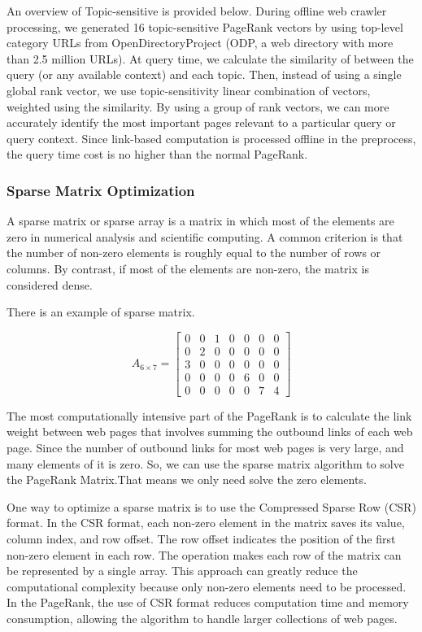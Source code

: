 \documentclass[lettersize,journal,12pt,conference]{IEEEtran}
\begin{document}
An overview of Topic-sensitive is provided below. During offline web crawler processing, we generated 16 topic-sensitive PageRank vectors by using top-level category URLs from OpenDirectoryProject (ODP, a web directory with more than 2.5 million URLs). At query time, we calculate the similarity of between the query (or any available context) and each topic. Then, instead of using a single global rank vector, we use topic-sensitivity linear combination of vectors, weighted using the similarity. By using a group of rank vectors, we can more accurately identify the most important pages relevant to a particular query or query context. Since link-based computation is processed offline in the preprocess, the query time cost is no higher than the normal PageRank.
\subsubsection{Sparse Matrix Optimization}
A sparse matrix or sparse array is a matrix in which most of the elements are zero in numerical analysis and scientific computing. A common criterion is that the number of non-zero elements is roughly equal to the number of rows or columns. By contrast, if most of the elements are non-zero, the matrix is considered dense.

There is an example of sparse matrix.

\begin{equation}
	A_{6\times 7}=
	\begin{bmatrix}
		0&0&1&0&0&0&0\\
		0&2&0&0&0&0&0\\
		3&0&0&0&0&0&0\\
		0&0&0&0&6&0&0\\
		0&0&0&0&0&7&4
	\end{bmatrix}
\end{equation}

The most computationally intensive part of the PageRank is to calculate the link weight between web pages that involves summing the outbound links of each web page. Since the number of outbound links for most web pages is very large, and many elements of it is zero. So, we can use the sparse matrix algorithm to solve the PageRank Matrix.That means we only need solve the zero elements.

One way to optimize a sparse matrix is to use the Compressed Sparse Row (CSR) format. In the CSR format, each non-zero element in the matrix saves its value, column index, and row offset. The row offset indicates the position of the first non-zero element in each row. The operation makes each row of the matrix can be represented by a single array. This approach can greatly reduce the computational complexity because only non-zero elements need to be processed. In the PageRank, the use of CSR format reduces computation time and memory consumption, allowing the algorithm to handle larger collections of web pages.
\end{document}
